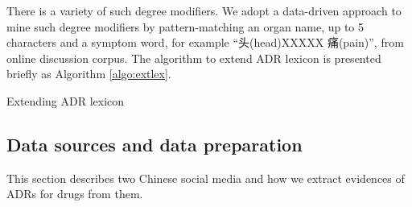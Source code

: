 There is a variety of such degree modifiers. We adopt a data-driven approach to mine such degree modifiers by pattern-matching an organ name, up to 5 characters and a symptom word, for example “头(head)XXXXX 痛(pain)”, from online discussion corpus. The algorithm to extend ADR lexicon is presented briefly as Algorithm \ref{algo:extlex}.

\begin{algorithm}
\caption{Extending ADR lexicon}
\label{algo:extlex}
\begin{algorithmic}[1]
	\EndIf
\EndFor
{}
	\EndIf
\EndFor
{} 
		\EndFor
	\EndIf
\EndFor
\end{algorithmic}
\end{algorithm}

\subsection{Data sources and data preparation}
\label{subsec:2.2}
This section describes two Chinese social media and how we extract evidences of ADRs for drugs from them.

